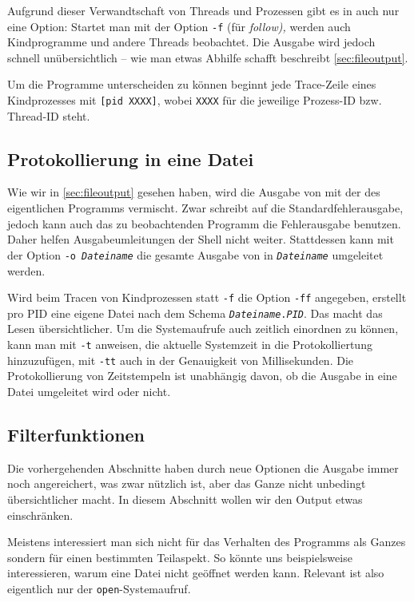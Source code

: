 Aufgrund dieser Verwandtschaft von Threads und Prozessen gibt es in \strace{} auch nur eine Option:
Startet man \strace{} mit der Option \texttt{-f} (für \emph{follow),} werden auch Kindprogramme und
andere Threads beobachtet. Die Ausgabe wird jedoch schnell unübersichtlich -- wie man etwas Abhilfe
schafft beschreibt \autoref{sec:fileoutput}.

Um die Programme unterscheiden zu können beginnt jede Trace-Zeile eines Kindprozesses mit
\texttt{[pid XXXX]}, wobei \texttt{XXXX} für die jeweilige Prozess-ID bzw. Thread-ID steht.


\subsection{Protokollierung in eine Datei}
\label{sec:fileoutput}

Wie wir in \autoref{sec:fileoutput} gesehen haben, wird die Ausgabe von \strace{} mit der des
eigentlichen Programms vermischt. Zwar schreibt \strace{} auf die Standardfehlerausgabe, jedoch
kann auch das zu beobachtenden Programm die Fehlerausgabe benutzen. Daher helfen Ausgabeumleitungen
der Shell nicht weiter. Stattdessen kann mit der Option \texttt{-o \emph{Dateiname}} die gesamte
Ausgabe von \strace{} in \texttt{\emph{Dateiname}} umgeleitet werden.

Wird beim Tracen von Kindprozessen statt \texttt{-f} die Option \texttt{-ff} angegeben, erstellt
\strace{} pro PID eine eigene Datei nach dem Schema \texttt{\emph{Dateiname}.\emph{PID}}. Das macht
das Lesen übersichtlicher. Um die Systemaufrufe auch zeitlich einordnen zu können, kann man
\strace{} mit \texttt{-t} anweisen, die aktuelle Systemzeit in die Protokolliertung hinzuzufügen,
mit \texttt{-tt} auch in der Genauigkeit von Millisekunden. Die Protokollierung von Zeitstempeln
ist unabhängig davon, ob die Ausgabe in eine Datei umgeleitet wird oder nicht.

\subsection{Filterfunktionen}

Die vorhergehenden Abschnitte haben durch neue Optionen die Ausgabe immer noch angereichert, was
zwar nützlich ist, aber das Ganze nicht unbedingt übersichtlicher macht. In diesem Abschnitt wollen
wir den Output etwas einschränken.

Meistens interessiert man sich nicht für das Verhalten des Programms als Ganzes sondern für einen
bestimmten Teilaspekt. So könnte uns beispielsweise interessieren, warum eine Datei nicht geöffnet
werden kann. Relevant ist also eigentlich nur der \texttt{open}-Systemaufruf.


